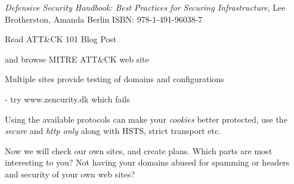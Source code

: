 \documentclass[Screen16to9,17pt]{foils}
\begin{document}
\myquestionspage




\emph{Defensive Security Handbook: Best Practices for Securing Infrastructure}, Lee Brotherston, Amanda Berlin ISBN: 978-1-491-96038-7


\begin{list1}
\item Read ATT\&CK 101 Blog Post\\
\item and browse MITRE ATT\&CK web site\\ 
\end{list1}



\begin{list1}
\item Multiple sites provide testing of domains and configurations
\item {}
\item {}
\item {} - try www.zencurity.dk which fails
\item {}
\item {}
\item {}
\item Using the available protocols can make your \emph{cookies} better protected, use the \emph{secure} and \emph{http only} along with HSTS, strict transport etc.
\end{list1}

Now we will check our own sites, and create plans. Which parts are most interesting to you? Not having your domains abused for spamming or headers and security of your own web sites?
\end{document}

